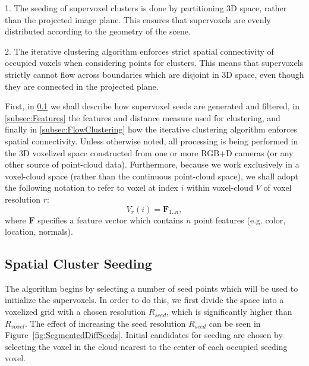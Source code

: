 1. The seeding of supervoxel clusters is done by partitioning 3D space, rather than the projected image plane. This ensures that supervoxels are evenly distributed according to the geometry of the scene.

2. The iterative clustering algorithm enforces strict spatial connectivity of occupied voxels when considering points for clusters. This means that supervoxels strictly cannot flow across boundaries which are disjoint in 3D space, even though they are connected in the projected plane.
 
First, in \ref{subsec:Seeding} we shall describe how supervoxel seeds are generated and filtered, in \ref{subsec:Features} the features and distance measure used for clustering, and finally in \ref{subsec:FlowClustering} how the iterative clustering algorithm enforces spatial connectivity. Unless otherwise noted, all processing is being performed in the 3D voxelized space constructed from one or more RGB+D cameras (or any other source of point-cloud data). Furthermore, because we work exclusively in a voxel-cloud space (rather than the continuous point-cloud space), we shall adopt the following notation to refer to voxel at index $i$ within voxel-cloud $V$ of voxel resolution $r$:
\begin{equation} \label{eqn:Voxel}
{V}_{r}(i) = \mathbf{F}_{1..n}, 
\end{equation}
where $\mathbf{F}$ specifies a feature vector which contains $n$ point features (e.g. color, location, normals). 

\subsection{Spatial Cluster Seeding}
\label{subsec:Seeding}
The algorithm begins by selecting a number of seed points which will be used to initialize the supervoxels. In order to do this, we first divide the space into a voxelized grid with a chosen resolution ${R}_{seed}$, which is significantly higher than ${R}_{voxel}$. The effect of increasing the seed resolution ${R}_{seed}$ can be seen in Figure~\ref{fig:SegmentedDiffSeeds}. Initial candidates for seeding are chosen by selecting the voxel in the cloud nearest to the center of each occupied seeding voxel.    

